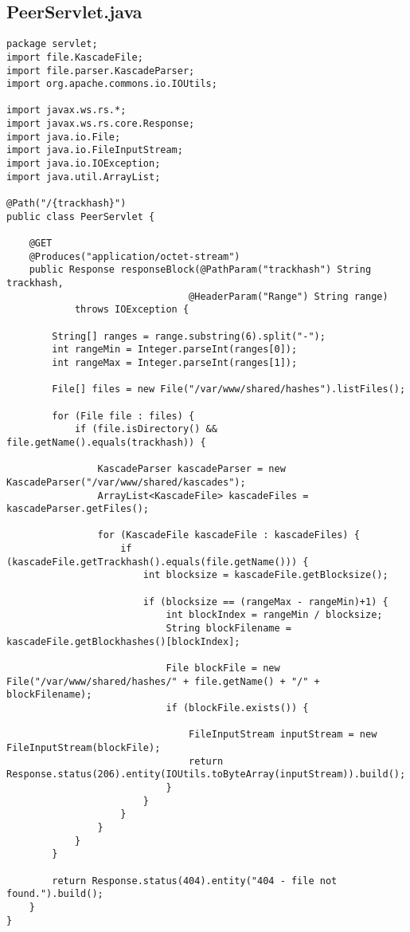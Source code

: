 \documentclass{acm_proc_article-sp}
\begin{document}
\subsection{PeerServlet.java}
\begin{lstlisting}package servlet;
import file.KascadeFile;
import file.parser.KascadeParser;
import org.apache.commons.io.IOUtils;

import javax.ws.rs.*;
import javax.ws.rs.core.Response;
import java.io.File;
import java.io.FileInputStream;
import java.io.IOException;
import java.util.ArrayList;

@Path("/{trackhash}")
public class PeerServlet {

    @GET
    @Produces("application/octet-stream")
    public Response responseBlock(@PathParam("trackhash") String trackhash,
                                @HeaderParam("Range") String range)
            throws IOException {

        String[] ranges = range.substring(6).split("-");
        int rangeMin = Integer.parseInt(ranges[0]);
        int rangeMax = Integer.parseInt(ranges[1]);

        File[] files = new File("/var/www/shared/hashes").listFiles();

        for (File file : files) {
            if (file.isDirectory() && file.getName().equals(trackhash)) {

                KascadeParser kascadeParser = new KascadeParser("/var/www/shared/kascades");
                ArrayList<KascadeFile> kascadeFiles = kascadeParser.getFiles();

                for (KascadeFile kascadeFile : kascadeFiles) {
                    if (kascadeFile.getTrackhash().equals(file.getName())) {
                        int blocksize = kascadeFile.getBlocksize();

                        if (blocksize == (rangeMax - rangeMin)+1) {
                            int blockIndex = rangeMin / blocksize;
                            String blockFilename = kascadeFile.getBlockhashes()[blockIndex];

                            File blockFile = new File("/var/www/shared/hashes/" + file.getName() + "/" + blockFilename);
                            if (blockFile.exists()) {

                                FileInputStream inputStream = new FileInputStream(blockFile);
                                return Response.status(206).entity(IOUtils.toByteArray(inputStream)).build();
                            }
                        }
                    }
                }
            }
        }

        return Response.status(404).entity("404 - file not found.").build();
    }
}
\end{lstlisting}
\end{document}
